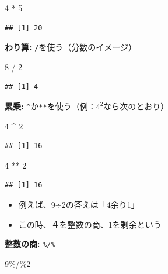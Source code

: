 \documentclass[
]{book}
\newenvironment{Shaded}{\begin{snugshade}}{\end{snugshade}}
\newcommand{\DecValTok}[1]{\textcolor[rgb]{0.00,0.00,0.81}{#1}}
\newcommand{\SpecialCharTok}[1]{\textcolor[rgb]{0.00,0.00,0.00}{#1}}
\providecommand{\tightlist}{%
  \setlength{\itemsep}{0pt}\setlength{\parskip}{0pt}}
\begin{document}
\begin{Shaded}
\begin{Highlighting}[]
\DecValTok{4} \SpecialCharTok{*} \DecValTok{5}
\end{Highlighting}
\end{Shaded}

\begin{verbatim}
## [1] 20
\end{verbatim}

\textbf{わり算:} \texttt{/}を使う（分数のイメージ）

\begin{Shaded}
\begin{Highlighting}[]
\DecValTok{8} \SpecialCharTok{/} \DecValTok{2}
\end{Highlighting}
\end{Shaded}

\begin{verbatim}
## [1] 4
\end{verbatim}

\textbf{累乗:} \texttt{\^{}}か\texttt{**}を使う（例：\(4^2\)なら次のとおり）

\begin{Shaded}
\begin{Highlighting}[]
\DecValTok{4} \SpecialCharTok{\^{}} \DecValTok{2}
\end{Highlighting}
\end{Shaded}

\begin{verbatim}
## [1] 16
\end{verbatim}

\begin{Shaded}
\begin{Highlighting}[]
\DecValTok{4} \SpecialCharTok{**} \DecValTok{2}
\end{Highlighting}
\end{Shaded}

\begin{verbatim}
## [1] 16
\end{verbatim}

\begin{itemize}
\tightlist
\item
  例えば、9÷2の答えは「4余り1」
\item
  この時、４を整数の商、1を剰余という
\end{itemize}

\textbf{整数の商:} \texttt{\%/\%}

\begin{Shaded}
\begin{Highlighting}[]
\DecValTok{9}\SpecialCharTok{\%/\%}\DecValTok{2}
\end{Highlighting}
\end{Shaded}
\end{document}

